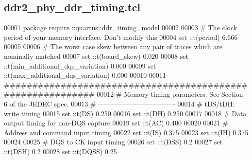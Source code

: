 \subsection{ddr2\+\_\+phy\+\_\+ddr\+\_\+timing.\+tcl}
\label{ddr2__phy__ddr__timing_8tcl_source}

\begin{DoxyCode}
00001 \textcolor{keyword}{package} require ::quartus::ddr\_timing\_model\textcolor{comment}{}
00002 \textcolor{comment}{}
00003 \textcolor{comment}{# The clock period of your memory interface. Don't modify this}
00004 \textcolor{comment}{}\textcolor{keyword}{set} ::t(period) 6.666\textcolor{comment}{}
00005 \textcolor{comment}{}
00006 \textcolor{comment}{# The worst case skew between any pair of traces which are nominally matched}
00007 \textcolor{comment}{}\textcolor{keyword}{set} ::t(board\_skew) 0.020\textcolor{comment}{}
00008 \textcolor{comment}{}\textcolor{keyword}{set} ::t(min\_additional\_dqs\_variation) 0.000\textcolor{comment}{}
00009 \textcolor{comment}{}\textcolor{keyword}{set} ::t(max\_additional\_dqs\_variation) 0.000\textcolor{comment}{}
00010 \textcolor{comment}{}
00011 \textcolor{comment}{###########################################################}
00012 \textcolor{comment}{}\textcolor{comment}{# Memory timing parameters. See Section 6 of the JEDEC spec.}
00013 \textcolor{comment}{}\textcolor{comment}{# ----------------------------------}
00014 \textcolor{comment}{}\textcolor{comment}{# tDS/tDH: write timing}
00015 \textcolor{comment}{}\textcolor{keyword}{set} ::t(DS) 0.250\textcolor{comment}{}
00016 \textcolor{comment}{}\textcolor{keyword}{set} ::t(DH) 0.250\textcolor{comment}{}
00017 \textcolor{comment}{}
00018 \textcolor{comment}{# Data output timing for non-DQS capture}
00019 \textcolor{comment}{}\textcolor{keyword}{set} ::t(AC) 0.400\textcolor{comment}{}
00020 \textcolor{comment}{}
00021 \textcolor{comment}{# Address and command input timing}
00022 \textcolor{comment}{}\textcolor{keyword}{set} ::t(IS) 0.375\textcolor{comment}{}
00023 \textcolor{comment}{}\textcolor{keyword}{set} ::t(IH) 0.375\textcolor{comment}{}
00024 \textcolor{comment}{}
00025 \textcolor{comment}{# DQS to CK input timing}
00026 \textcolor{comment}{}\textcolor{keyword}{set} ::t(DSS) 0.2\textcolor{comment}{}
00027 \textcolor{comment}{}\textcolor{keyword}{set} ::t(DSH) 0.2\textcolor{comment}{}
00028 \textcolor{comment}{}\textcolor{keyword}{set} ::t(DQSS) 0.25\textcolor{comment}{}

\end{DoxyCode}
